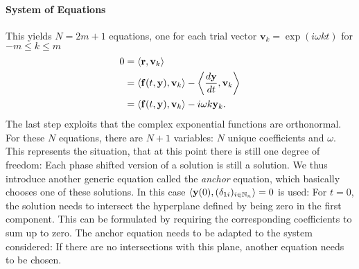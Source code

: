 \paragraph{System of Equations} This yields $N = 2m+1$ equations, one for each trial vector $\mathbf{v}_k = \exp\left( i \omega k t \right)$ for $-m \le k \le m$
	\begin{align}
		0 &= \langle \mathbf{r} , \mathbf{v}_k \rangle \nonumber \\
		&= \langle \mathbf{f}(t,\mathbf{y}), \mathbf{v}_k \rangle - \left\langle \frac{d\mathbf{y}}{dt}, \mathbf{v}_k \right\rangle \nonumber \\
		&= \langle \mathbf{f}(t,\mathbf{y}), \mathbf{v}_k \rangle - i \omega k \mathbf{y}_k\label{eq:innerprod} \text.
	\end{align}
The last step exploits that the complex exponential functions are orthonormal.
For these $N$ equations, there are $N+1$ variables: $N$ unique coefficients and $\omega$.
This represents the situation, that at this point there is still one degree of freedom: Each phase shifted version of a solution is still a solution.
We thus introduce another generic equation called the \emph{anchor} equation, which basically chooses one of these solutions.
In this case $\langle \mathbf{y}(0), (\delta_{1i})_{i \in \mathbb{N}_n} \rangle = 0$ is used:
For $t = 0$, the solution needs to intersect the hyperplane defined by being zero in the first component.
This can be formulated by requiring the corresponding coefficients to sum up to zero.
The anchor equation needs to be adapted to the system considered: If there are no intersections with this plane, another equation needs to be chosen.

